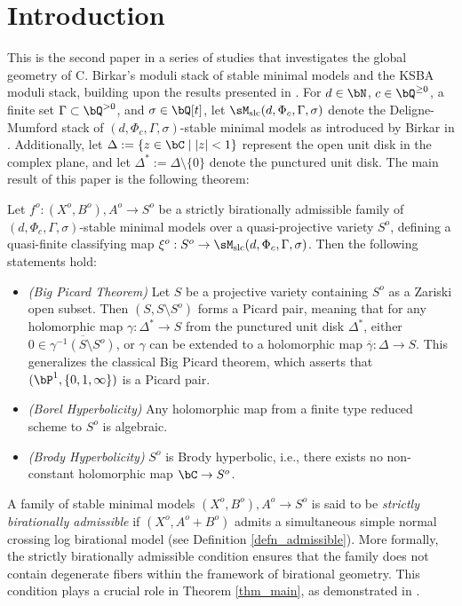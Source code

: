 \documentclass[11pt,letterpaper]{amsart}
\numberwithin{equation}{section}
\begin{document}
	\section{Introduction}
	This is the second paper in a series of studies that investigates the global geometry of C. Birkar's moduli stack of stable minimal models and the KSBA moduli stack, building upon the results presented in \cite{stjc2025}. For $d \in \bN$, $c \in \bQ^{\geq 0}$, a finite set $\Gamma \subset \bQ^{> 0}$, and $\sigma \in \bQ[t]$, let $\sM_{\rm slc}(d,\Phi_c,\Gamma,\sigma)$ denote the Deligne-Mumford stack of $(d,\Phi_c,\Gamma,\sigma)$-stable minimal models as introduced by Birkar in \cite{Birkar2022}. Additionally, let $\Delta := \{z \in \bC \mid |z| < 1\}$ represent the open unit disk in the complex plane, and let $\Delta^\ast := \Delta \setminus \{0\}$ denote the punctured unit disk.
	The main result of this paper is the following theorem:  

	\begin{thm}\label{thm_main}  
		Let $f^o:(X^o,B^o),A^o \to S^o$ be a strictly birationally admissible family of $(d,\Phi_c,\Gamma,\sigma)$-stable minimal models over a quasi-projective variety $S^o$, defining a quasi-finite classifying map $\xi^o:S^o \to \sM_{\rm slc}(d,\Phi_c,\Gamma,\sigma)$. Then the following statements hold:  
		\begin{itemize}  
			\item \emph{(Big Picard Theorem)} Let $S$ be a projective variety containing $S^o$ as a Zariski open subset. Then $(S, S \setminus S^o)$ forms a Picard pair, meaning that for any holomorphic map $\gamma: \Delta^\ast \to S$ from the punctured unit disk $\Delta^\ast$, either $0 \in \overline{\gamma^{-1}(S \setminus S^o)}$, or $\gamma$ can be extended to a holomorphic map $\overline{\gamma}: \Delta \to S$. This generalizes the classical Big Picard theorem, which asserts that $(\bP^1, \{0, 1, \infty\})$ is a Picard pair.  
			\item \emph{(Borel Hyperbolicity)} Any holomorphic map from a finite type reduced scheme to $S^o$ is algebraic.  
			\item \emph{(Brody Hyperbolicity)} $S^o$ is Brody hyperbolic, i.e., there exists no non-constant holomorphic map $\bC \to S^o$.  
		\end{itemize}  
	\end{thm}  

	A family of stable minimal models $(X^o, B^o), A^o \to S^o$ is said to be \emph{strictly birationally admissible} if $(X^o, A^o + B^o)$ admits a simultaneous simple normal crossing log birational model (see Definition \ref{defn_admissible}). More formally, the strictly birationally admissible condition ensures that the family does not contain degenerate fibers within the framework of birational geometry. This condition plays a crucial role in Theorem \ref{thm_main}, as demonstrated in \cite{stjc2025}.
	
\end{document}
